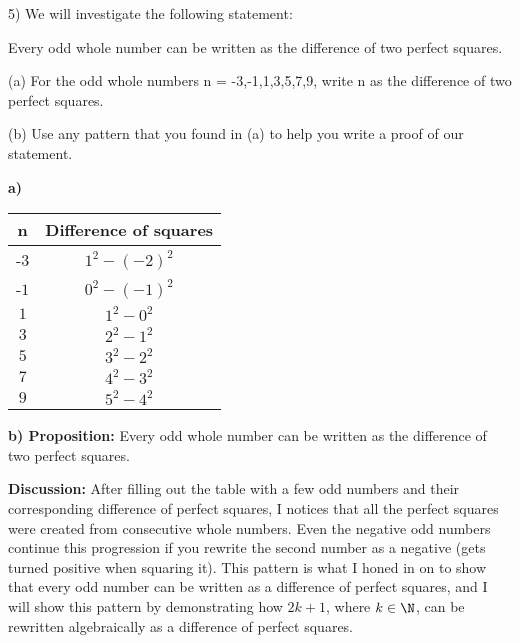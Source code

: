 	\begin{paragraph}{5)}
		We will investigate the following statement:
		
		\begin{center}
			Every odd whole number can be written as the difference of two perfect
			squares.
		\end{center}

		(a)  For the odd whole numbers n = -3,-1,1,3,5,7,9, write n as the difference of two perfect squares. \spacing
		
		(b)  Use any pattern that you found in (a) to help you write a proof of our statement.
	
		\separate\spacing

		\textbf{a)}
		\begin{center}
		\begin{tabular}{||c | c||}
			
			\hline
			n & Difference of squares \\[0.5ex]
			\hline\hline
			-$3$ & $1^2 - (-2)^2$ \\
			\hline 
			-$1$ & $0^2 - (-1)^2$ \\
			\hline 
			$1$ & $1^2 - 0^2$ \\
			\hline 
			$3$ & $2^2 - 1^2$ \\
			\hline 
			$5$ & $3^2 - 2^2$ \\
			\hline 
			$7$ & $4^2 - 3^2$ \\
			\hline 
			$9$ & $5^2 - 4^2$ \\
			\hline 
		\end{tabular}
	\end{center}
	\end{paragraph}

	\pagebreak

	\textbf{b) Proposition:} Every odd whole number can be written as the 
	difference of two perfect squares. \spacing

	\textbf{Discussion:} After filling out the table with a few
	odd numbers and their corresponding difference of perfect squares, I
	notices that all the perfect squares were created from consecutive whole
	numbers. Even the negative odd numbers continue this progression if you
	rewrite the second number as a negative (gets turned positive when squaring it).
	This pattern is what I honed in on to show that every odd number can 
	be written as a difference of perfect squares, and I will show this pattern 
	by demonstrating how $2k + 1$, where $k \in \N$, can be rewritten algebraically as a difference
	of perfect squares. \spacing
	
